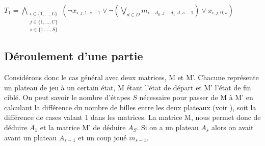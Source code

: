 \documentclass[utf8]{article}
\begin{document}
$T_1 = {\underset{\substack{i\in\{1,...,L\} \\ j\in\{1,...,C\} \\ s\in \{1,...,S\}}}{\bigwedge}}(\neg x_{i,j,1,s-1} \vee \neg({\underset{d\in D}{\bigvee}}m_{i-d_0,j-d_1,d,s-1})\vee x_{i,j,0,s})$\newline

\subsection{Déroulement d'une partie}
Considérons donc le cas général avec deux matrices, M et M'. Chacune représente un plateau de jeu à un certain état, M étant l'état de départ et M' l'état de fin ciblé. On peut savoir le nombre d'étapes $S$ nécessaire pour passer de M à M' en calculant la différence du nombre de billes entre les deux plateaux (voir \textbf{}), soit la différence de cases valant 1 dans les matrices.
\newline
La matrice M, nous permet donc de déduire $A_1$ et la matrice M' de déduire $A_S$.
\newline
Si on a un plateau $A_s$ alors on avait avant un plateau $A_{s-1}$ et un coup joué $m_{s-1}$. 
\end{document}

